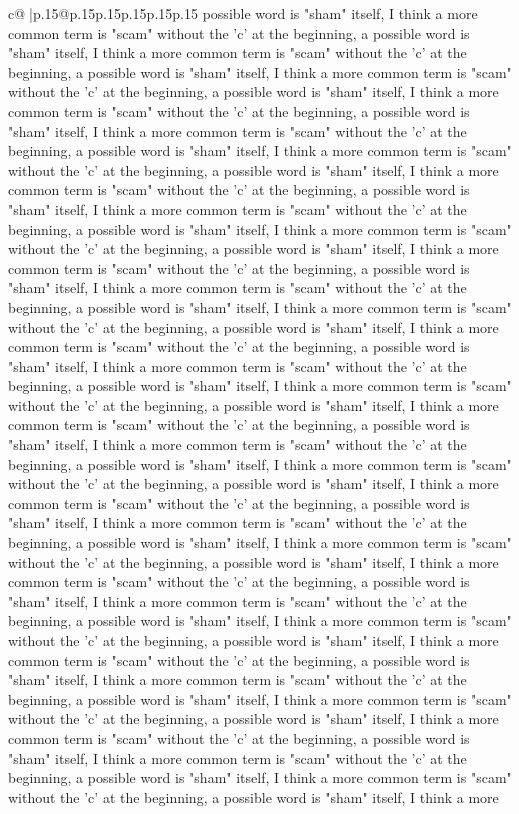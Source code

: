 \documentclass{article}
\begin{document}
{\begin{supertabular}{c@{$\;$}|p{.15\linewidth}@{}p{.15\linewidth}p{.15\linewidth}p{.15\linewidth}p{.15\linewidth}p{.15\linewidth}}
{{{possible word is "sham" itself, I think a more common term is "scam" without the 'c' at the beginning, a possible word is "sham" itself, I think a more common term is "scam" without the 'c' at the beginning, a possible word is "sham" itself, I think a more common term is "scam" without the 'c' at the beginning, a possible word is "sham" itself, I think a more common term is "scam" without the 'c' at the beginning, a possible word is "sham" itself, I think a more common term is "scam" without the 'c' at the beginning, a possible word is "sham" itself, I think a more common term is "scam" without the 'c' at the beginning, a possible word is "sham" itself, I think a more common term is "scam" without the 'c' at the beginning, a possible word is "sham" itself, I think a more common term is "scam" without the 'c' at the beginning, a possible word is "sham" itself, I think a more common term is "scam" without the 'c' at the beginning, a possible word is "sham" itself, I think a more common term is "scam" without the 'c' at the beginning, a possible word is "sham" itself, I think a more common term is "scam" without the 'c' at the beginning, a possible word is "sham" itself, I think a more common term is "scam" without the 'c' at the beginning, a possible word is "sham" itself, I think a more common term is "scam" without the 'c' at the beginning, a possible word is "sham" itself, I think a more common term is "scam" without the 'c' at the beginning, a possible word is "sham" itself, I think a more common term is "scam" without the 'c' at the beginning, a possible word is "sham" itself, I think a more common term is "scam" without the 'c' at the beginning, a possible word is "sham" itself, I think a more common term is "scam" without the 'c' at the beginning, a possible word is "sham" itself, I think a more common term is "scam" without the 'c' at the beginning, a possible word is "sham" itself, I think a more common term is "scam" without the 'c' at the beginning, a possible word is "sham" itself, I think a more common term is "scam" without the 'c' at the beginning, a possible word is "sham" itself, I think a more common term is "scam" without the 'c' at the beginning, a possible word is "sham" itself, I think a more common term is "scam" without the 'c' at the beginning, a possible word is "sham" itself, I think a more common term is "scam" without the 'c' at the beginning, a possible word is "sham" itself, I think a more common term is "scam" without the 'c' at the beginning, a possible word is "sham" itself, I think a more common term is "scam" without the 'c' at the beginning, a possible word is "sham" itself, I think a more common term is "scam" without the 'c' at the beginning, a possible word is "sham" itself, I think a more common term is "scam" without the 'c' at the beginning, a possible word is "sham" itself, I think a more common term is "scam" without the 'c' at the beginning, a possible word is "sham" itself, I think a more common term is "scam" without the 'c' at the beginning, a possible word is "sham" itself, I think a more common term is "scam" without the 'c' at the beginning, a possible word is "sham" itself, I think a more }}}
\end{supertabular}}
\end{document}
